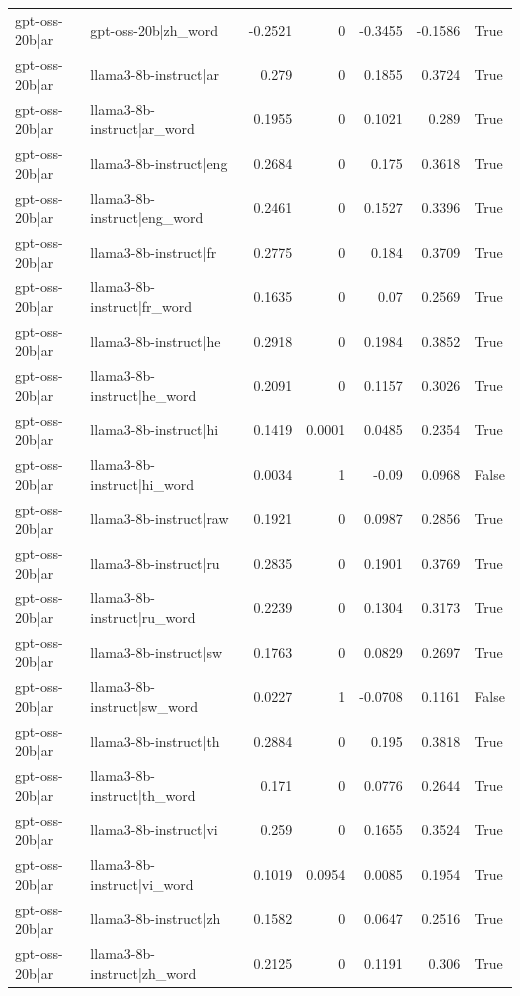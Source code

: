 \begin{table}
\begin{tabular}{l l r r r r l}
gpt-oss-20b|ar & gpt-oss-20b|zh_word & -0.2521 & 0 & -0.3455 & -0.1586 & True \\
gpt-oss-20b|ar & llama3-8b-instruct|ar & 0.279 & 0 & 0.1855 & 0.3724 & True \\
gpt-oss-20b|ar & llama3-8b-instruct|ar_word & 0.1955 & 0 & 0.1021 & 0.289 & True \\
gpt-oss-20b|ar & llama3-8b-instruct|eng & 0.2684 & 0 & 0.175 & 0.3618 & True \\
gpt-oss-20b|ar & llama3-8b-instruct|eng_word & 0.2461 & 0 & 0.1527 & 0.3396 & True \\
gpt-oss-20b|ar & llama3-8b-instruct|fr & 0.2775 & 0 & 0.184 & 0.3709 & True \\
gpt-oss-20b|ar & llama3-8b-instruct|fr_word & 0.1635 & 0 & 0.07 & 0.2569 & True \\
gpt-oss-20b|ar & llama3-8b-instruct|he & 0.2918 & 0 & 0.1984 & 0.3852 & True \\
gpt-oss-20b|ar & llama3-8b-instruct|he_word & 0.2091 & 0 & 0.1157 & 0.3026 & True \\
gpt-oss-20b|ar & llama3-8b-instruct|hi & 0.1419 & 0.0001 & 0.0485 & 0.2354 & True \\
gpt-oss-20b|ar & llama3-8b-instruct|hi_word & 0.0034 & 1 & -0.09 & 0.0968 & False \\
gpt-oss-20b|ar & llama3-8b-instruct|raw & 0.1921 & 0 & 0.0987 & 0.2856 & True \\
gpt-oss-20b|ar & llama3-8b-instruct|ru & 0.2835 & 0 & 0.1901 & 0.3769 & True \\
gpt-oss-20b|ar & llama3-8b-instruct|ru_word & 0.2239 & 0 & 0.1304 & 0.3173 & True \\
gpt-oss-20b|ar & llama3-8b-instruct|sw & 0.1763 & 0 & 0.0829 & 0.2697 & True \\
gpt-oss-20b|ar & llama3-8b-instruct|sw_word & 0.0227 & 1 & -0.0708 & 0.1161 & False \\
gpt-oss-20b|ar & llama3-8b-instruct|th & 0.2884 & 0 & 0.195 & 0.3818 & True \\
gpt-oss-20b|ar & llama3-8b-instruct|th_word & 0.171 & 0 & 0.0776 & 0.2644 & True \\
gpt-oss-20b|ar & llama3-8b-instruct|vi & 0.259 & 0 & 0.1655 & 0.3524 & True \\
gpt-oss-20b|ar & llama3-8b-instruct|vi_word & 0.1019 & 0.0954 & 0.0085 & 0.1954 & True \\
gpt-oss-20b|ar & llama3-8b-instruct|zh & 0.1582 & 0 & 0.0647 & 0.2516 & True \\
gpt-oss-20b|ar & llama3-8b-instruct|zh_word & 0.2125 & 0 & 0.1191 & 0.306 & True \\

\end{tabular}
\end{table}
